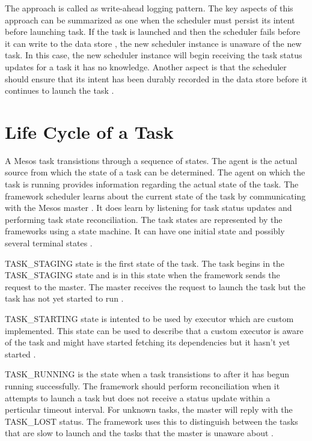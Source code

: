 \documentclass[9pt,twocolumn,twoside]{../../styles/osajnl}
\begin{document}
\begin{itemize}
   The approach is called as write-ahead logging pattern. The key
   aspects of this approach can be summarized as one when the
   scheduler must persist its intent before launching task. If the
   task is launched and then the scheduler fails before it can write
   to the data store , the new scheduler instance is unaware of the
   new task. In this case, the new scheduler instance will begin
   receiving the task status updates for a task it has no
   knowledge. Another aspect is that the scheduler should ensure that
   its intent has been durably recorded in the data store before it
   continues to launch the task \cite{www-mesos-frmwrk}.
\end{itemize}

\section{Life Cycle of a Task}
A Mesos task transistions through a sequence of states. The agent is
the actual source from which the state of a task can be
determined. The agent on which the task is running provides
information regarding the actual state of the task. The framework
scheduler learns about the current state of the task by communicating
with the Mesos master \cite{www-mesos-arch}. It does learn by
listening for task status updates and performing task state
reconciliation.  The task states are represented by the frameworks
using a state machine. It can have one initial state and possibly
several terminal states \cite{www-mesos-frmwrk}.

TASK\_STAGING state is the first state of the task. The task begins in
the TASK\_STAGING state and is in this state when the framework sends
the request to the master. The master receives the request to launch
the task but the task has not yet started to run
\cite{www-mesos-frmwrk}.

TASK\_STARTING state is intented to be used by executor which are
custom implemented. This state can be used to describe that a custom
executor is aware of the task and might have started fetching its
dependencies but it hasn't yet started \cite{www-mesos-frmwrk}.

TASK\_RUNNING is the state when a task transistions to after it has
begun running successfully. The framework should perform
reconciliation when it attempts to launch a task but does not receive
a status update within a perticular timeout interval. For unknown
tasks, the master will reply with the TASK\_LOST status. The framework
uses this to distinguish between the tasks that are slow to launch and
the tasks that the master is unaware about \cite{www-mesos-frmwrk}.
\end{document}
